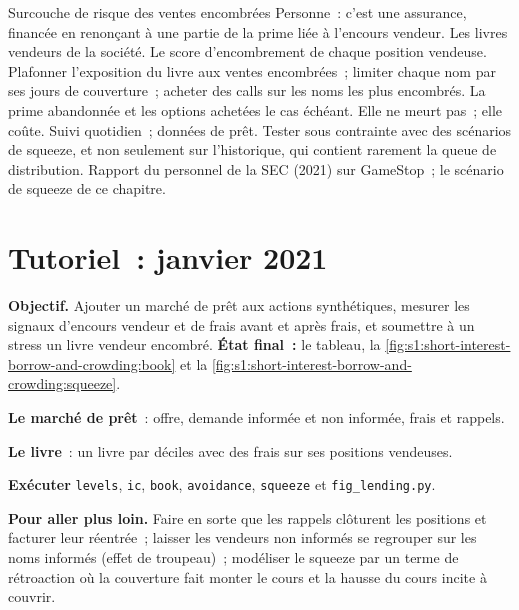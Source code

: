 \begin{strategyfile}{Surcouche de risque des ventes encombrées}\label{strat:s1:short-interest-borrow-and-crowding:overlay}
 Personne~: c'est une assurance, financée en renonçant à une partie de la prime liée à l'encours vendeur.
 Les livres vendeurs de la société.
 Le score d'encombrement de chaque position vendeuse.
 Plafonner l'exposition du livre aux ventes encombrées~; limiter chaque nom par ses jours de couverture~; acheter des calls sur les noms les plus encombrés.
 La prime abandonnée et les options achetées le cas échéant.
 Elle ne meurt pas~; elle coûte.
 Suivi quotidien~; données de prêt.
 Tester sous contrainte avec des scénarios de squeeze, et non seulement sur l'historique, qui contient rarement la queue de distribution.
 Rapport du personnel de la SEC (2021) sur GameStop~; le scénario de squeeze de ce chapitre.
\end{strategyfile}

\section{Tutoriel~: janvier 2021}\label{tut:s1:short-interest-borrow-and-crowding:tut}

\begin{tutorial}
\textbf{Objectif.} Ajouter un marché de prêt aux actions synthétiques, mesurer les signaux d'encours vendeur et de frais avant et après frais, et soumettre à un stress un livre vendeur encombré.
\textbf{État final~:} le tableau, la \cref{fig:s1:short-interest-borrow-and-crowding:book} et la \cref{fig:s1:short-interest-borrow-and-crowding:squeeze}.
\begin{tutsteps}
\item \textbf{Le marché de prêt}~: offre, demande informée et non informée, frais et rappels.
\label{lst:s1:short-interest-borrow-and-crowding:lending}
\item \textbf{Le livre}~: un livre par déciles avec des frais sur ses positions vendeuses.
\label{lst:s1:short-interest-borrow-and-crowding:book}
\item \textbf{Exécuter} \texttt{levels}, \texttt{ic}, \texttt{book}, \texttt{avoidance}, \texttt{squeeze} et \texttt{fig\_lending.py}.
\end{tutsteps}
\textbf{Pour aller plus loin.} Faire en sorte que les rappels clôturent les positions et facturer leur réentrée~; laisser les vendeurs non informés se regrouper sur les noms informés (effet de troupeau)~; modéliser le squeeze
par un terme de rétroaction où la couverture fait monter le cours et la hausse du cours incite à couvrir.
\end{tutorial}

